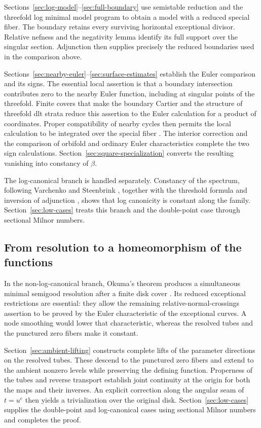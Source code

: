 Sections~\ref{sec:log-model}--\ref{sec:full-boundary} use semistable
reduction and the threefold log minimal model program
\cite[Chapter~7]{KM1998} to obtain a model with a reduced special
fiber.  The boundary retains every surviving horizontal exceptional
divisor.  Relative nefness and the negativity lemma identify its full
support over the singular section.  Adjunction then supplies precisely
the reduced boundaries used in the comparison above.

Sections~\ref{sec:nearby-euler}--\ref{sec:surface-estimates} establish
the Euler comparison and its signs.  The essential local assertion is
that a boundary intersection contributes zero to the nearby Euler
function, including at singular points of the threefold.  Finite covers
that make the boundary Cartier and the structure of threefold dlt strata reduce
this assertion to the Euler calculation for a product of coordinates.
Proper compatibility of nearby cycles then permits the local
calculation to be integrated over the special fiber
\cite{SchuermannNearby,MaximSchuermann}.  The interior correction and the
comparison of orbifold and ordinary Euler characteristics complete the
two sign calculations.  Section~\ref{sec:square-specialization} converts
the resulting vanishing into constancy of $\beta$.

The log-canonical branch is handled separately.  Constancy of the
spectrum, following Varchenko and Steenbrink
\cite{Varchenko1982,Steenbrink1985}, together with the threshold formula
\cite[Theorem~9.5]{Kollar1997Pairs} and inversion of adjunction
\cite{Kawakita2007}, shows that log canonicity is constant along the
family.  Section~\ref{sec:low-cases} treats this branch and the
double-point case through sectional Milnor numbers.

\subsection*{From resolution to a homeomorphism of the functions}

In the non-log-canonical branch, Okuma's theorem produces a simultaneous
minimal semigood resolution
after a finite disk cover \cite[Theorem~1.2]{Okuma2004}.  Its reduced
exceptional restrictions are essential: they allow the remaining
relative-normal-crossings assertion to be proved by the Euler
characteristic of the exceptional curves.  A node smoothing would
lower that characteristic, whereas the resolved tubes and the
punctured zero fibers make it constant.

Section~\ref{sec:ambient-lifting} constructs complete lifts of the
parameter directions on the resolved tubes.  These descend to the
punctured zero fibers and extend to the ambient nonzero levels while
preserving the defining function.  Properness of the tubes and reverse
transport establish joint continuity at the origin for both the maps
and their inverses.  An explicit correction along the angular seam of
$t=u^e$ then yields a trivialization over the original disk.
Section~\ref{sec:low-cases} supplies the double-point and log-canonical
cases using sectional Milnor numbers and completes the proof.


